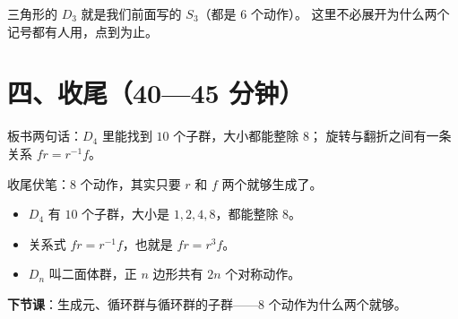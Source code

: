\begin{zhu}
  三角形的 \(D_3\) 就是我们前面写的 \(S_3\)（都是 \(6\) 个动作）。
  这里不必展开为什么两个记号都有人用，点到为止。
\end{zhu}

\section*{四、收尾（40—45 分钟）}

板书两句话：\(D_4\) 里能找到 \(10\) 个子群，大小都能整除 \(8\)；
旋转与翻折之间有一条关系 \(fr=r^{-1}f\)。

收尾伏笔：\(8\) 个动作，其实只要 \(r\) 和 \(f\) 两个就够生成了。

\begin{xiaojie}
  \begin{itemize}
    \item \(D_4\) 有 \(10\) 个子群，大小是 \(1,2,4,8\)，都能整除 \(8\)。
    \item 关系式 \(fr=r^{-1}f\)，也就是 \(fr=r^3f\)。
    \item \(D_n\) 叫二面体群，正 \(n\) 边形共有 \(2n\) 个对称动作。
  \end{itemize}
\end{xiaojie}

\noindent\textbf{下节课}：生成元、循环群与循环群的子群——\(8\) 个动作为什么两个就够。